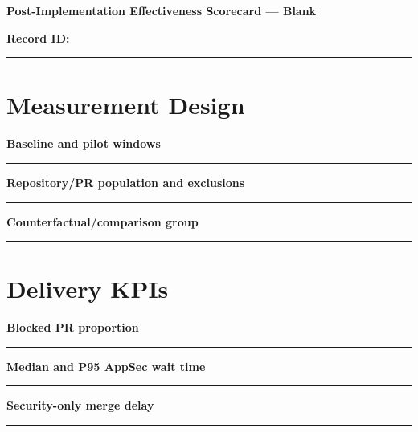 \documentclass[11pt,letterpaper]{article}
\begin{document}
\begin{center}{\LARGE\bfseries Post-Implementation Effectiveness Scorecard --- Blank}\par
\vspace{4pt}{\small Print-ready unfilled assessment instrument}\par
\end{center}
\noindent\textbf{Record ID:} \rule{2.6in}{0.4pt}\par
\section{Measurement Design}
\noindent\textbf{Baseline and pilot windows}\par
\vspace{1.1em}\noindent\rule{0.96\linewidth}{0.4pt}\par\vspace{0.65em}
\noindent\textbf{Repository/PR population and exclusions}\par
\vspace{1.1em}\noindent\rule{0.96\linewidth}{0.4pt}\par\vspace{0.65em}
\noindent\textbf{Counterfactual/comparison group}\par
\vspace{1.1em}\noindent\rule{0.96\linewidth}{0.4pt}\par\vspace{0.65em}
\section{Delivery KPIs}
\noindent\textbf{Blocked PR proportion}\par
\vspace{1.1em}\noindent\rule{0.96\linewidth}{0.4pt}\par\vspace{0.65em}
\noindent\textbf{Median and P95 AppSec wait time}\par
\vspace{1.1em}\noindent\rule{0.96\linewidth}{0.4pt}\par\vspace{0.65em}
\noindent\textbf{Security-only merge delay}\par
\vspace{1.1em}\noindent\rule{0.96\linewidth}{0.4pt}\par\vspace{0.65em}
\end{document}
